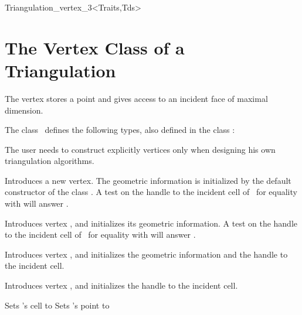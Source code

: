 \begin{ccClassTemplate}{Triangulation_vertex_3<Traits,Tds>}
\section{The Vertex Class of a Triangulation\\ \protect
{} } 
\label{Triangulation3-sec-class-Vertex}


\ccDefinition
The vertex stores a point and gives access to an incident face of
maximal dimension.



\ccTypes
{}
The class \ccClassTemplateName\ defines the following types, also
defined in the class :

\ccGlue
{}
\ccGlue
{}

\begin{ccAdvanced}
\ccCreation
The user needs to construct explicitly vertices only when designing his
own triangulation algorithms. 

{Introduces a new vertex. The geometric information is initialized by
the default constructor of the class . A test on the handle
to the incident cell of \ccVar\ for equality with  will
answer .} 

{Introduces vertex \ccVar, and initializes its geometric information.
A test on the handle
to the incident cell of \ccVar\ for equality with  will
answer .}

{Introduces vertex \ccVar, and initializes the geometric information and 
the handle to the incident cell.}

{Introduces vertex \ccVar, and initializes the handle to the incident cell.}

{Sets \ccVar's cell to }
{Sets \ccVar's point to }


\end{ccAdvanced}
\end{ccClassTemplate}
